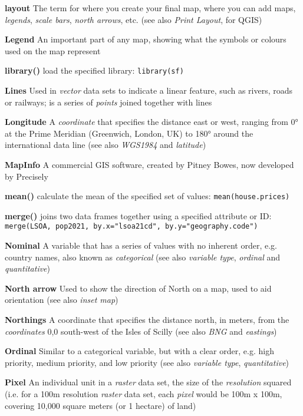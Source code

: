 \documentclass[a4paper,10pt]{article}
\begin{document}
\begin{multicols}{2}
\textbf{layout} The term for where you create your final map, where you can add maps, \textit{legends}, \textit{scale bars}, \textit{north arrows}, etc. (see also \textit{Print Layout}, for QGIS)

\textbf{Legend} An important part of any map, showing what the symbols or colours used on the map represent 

\textbf{library()} load the specified library: \texttt{library(sf)}

\textbf{Lines} Used in \textit{vector} data sets to indicate a linear feature, such as rivers, roads or railways; is a series of \textit{points} joined together with lines

\textbf{Longitude} A \textit{coordinate} that specifies the distance east or west, ranging from \ang{0} at the Prime Meridian (Greenwich, London, UK) to \ang{180} around the international data line (see also \textit{WGS1984} and \textit{latitude})

\textbf{MapInfo} A commercial GIS software, created by Pitney Bowes, now developed by Precisely 

\textbf{mean()} calculate the mean of the specified set of values: \texttt{mean(house.prices)}

\textbf{merge()} joins two data frames together using a specified attribute or ID: \texttt{merge(LSOA, pop2021, by.x="lsoa21cd", by.y="geography.code")}

\textbf{Nominal} A variable that has a series of values with no inherent order, e.g. country names, also known as \textit{categorical} (see also \textit{variable type}, \textit{ordinal} and \textit{quantitative})

\textbf{North arrow} Used to show the direction of North on a map, used to aid orientation (see also \textit{inset map})

\textbf{Northings} A coordinate that specifies the distance north, in meters, from the \textit{coordinates} 0,0 south-west of the Isles of Scilly (see also \textit{BNG} and \textit{eastings})

\textbf{Ordinal} Similar to a categorical variable, but with a clear order, e.g. high priority, medium priority, and low priority (see also \textit{variable type}, \textit{quantitative}) 

\textbf{Pixel} An individual unit in a \textit{raster} data set, the size of the \textit{resolution} squared (i.e. for a 100m resolution \textit{raster} data set, each \textit{pixel} would be 100m x 100m, covering 10,000 square meters (or 1 hectare) of land)


\end{multicols}
\end{document}
